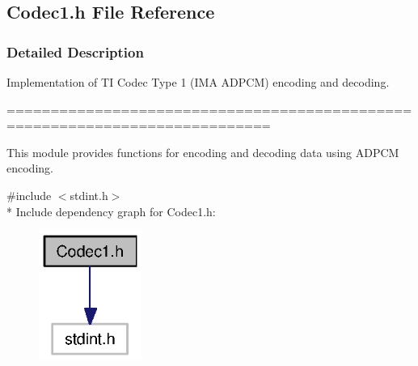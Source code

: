\subsection{Codec1.\+h File Reference}
\label{_codec1_8h}


\subsubsection{Detailed Description}
Implementation of T\+I Codec Type 1 (I\+M\+A A\+D\+P\+C\+M) encoding and decoding. 

============================================================================

This module provides functions for encoding and decoding data using A\+D\+P\+C\+M encoding. 

{\ttfamily \#include $<$stdint.\+h$>$}\\*
Include dependency graph for Codec1.\+h\+:
\nopagebreak
\begin{figure}[H]
\begin{center}
\leavevmode
\includegraphics[width=95pt]{_codec1_8h__incl}
\end{center}
\end{figure}

